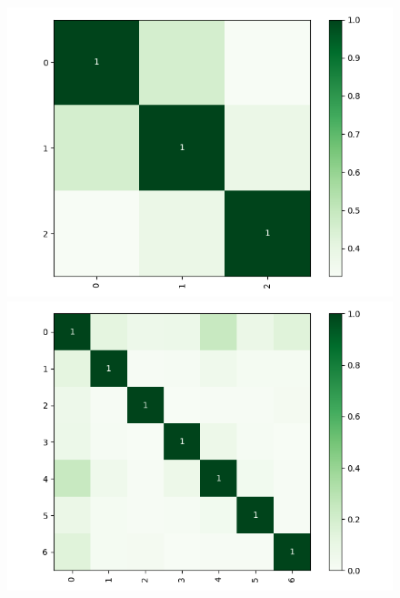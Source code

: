 \begin{figure}[!h]
\begin{minipage}[t]{.45\textwidth}
\centering
\includegraphics[width=\textwidth]{figuras/seb/hm-EM16b.png} 
\end{minipage}%
\begin{minipage}[t]{.45\textwidth}
\centering
\includegraphics[width=\textwidth]{figuras/seb/hm-EM21b.png}
\end{minipage}%
\hfill
\begin{minipage}[t]{.45\textwidth}
\centering

\end{minipage}
\end{figure}
